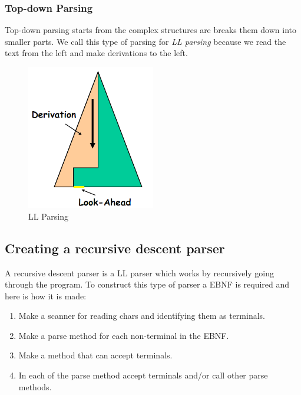 		\subsubsection*{Top-down Parsing}
			Top-down parsing starts from the complex structures are breaks them down into smaller parts.
			We call this type of parsing for {\it LL parsing} because we read the text from the left and make derivations to the left.
			\begin{figure}[H]
				\centering
				\includegraphics[width=0.5\textwidth]{rapport/2/figures/topdown.png}
				\caption{LL Parsing}\label{fig:llparsing}
			\end{figure}
	
	\subsection{Creating a recursive descent parser}
		A recursive descent parser is a LL parser which works by recursively going through the program.
		To construct this type of parser a EBNF is required and here is how it is made:
		\begin{enumerate}
			\item Make a scanner for reading chars and identifying them as terminals.
			\item Make a parse method for each non-terminal in the EBNF.
			\item Make a method that can accept terminals.
			\item In each of the parse method accept terminals and/or call other parse methods.
		\end{enumerate}		
		
		
		
		